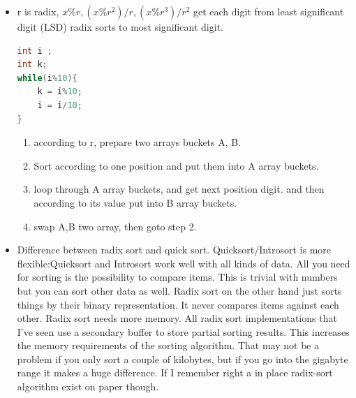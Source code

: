 \documentclass[a4paper,11pt,twoside]{book}
\begin{document}
\begin{itemize}
\item r is radix, $x\%r, (x\%r^{2})/r, (x\%r^{3})/r^{2}$  get each digit from least significant digit (LSD) radix sorts to most significant digit. 

\begin{lstlisting}[frame=single, language=c++]
int i ;
int k;
while(i%10){
	k = i%10;
	i = i/10;
}
\end{lstlisting}

\begin{enumerate}
\item according to r, prepare two arrays buckets A, B. 
\item Sort according to one position and put them into A array buckets. 
\item loop through A array buckets, and get next position digit. and then according to its value put into B array buckets.
\item swap A,B two array, then goto step 2.
\end{enumerate}

	\item Difference between radix sort and quick sort. Quicksort/Introsort is more flexible:Quicksort and Introsort work well with all kinds of data. All you need for sorting is the possibility to compare items. This is trivial with numbers but you can sort other data as well. Radix sort on the other hand just sorts things by their binary representation. It never compares items against each other. Radix sort needs more memory. All radix sort implementations that I've seen use a secondary buffer to store partial sorting results. This increases the memory requirements of the sorting algorithm. That may not be a problem if you only sort a couple of kilobytes, but if you go into the gigabyte range it makes a huge difference. If I remember right a in place radix-sort algorithm exist on paper though.

\end{itemize}
\end{document}
